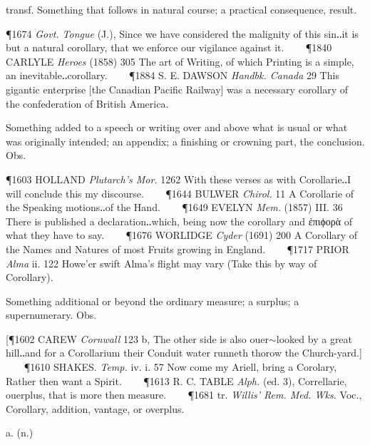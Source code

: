 \begin{description}[wide, labelwidth=!, labelindent=0pt]
\begin{myenumerate}
 transf. Something that follows in natural course; a practical consequence, result.

\P 1674  \textit{Govt. Tongue} (J.), Since we have considered the malignity of this sin‥it is but a natural corollary, that we enforce our vigilance against it.    
\P 1840 CARLYLE  \textit{Heroes} (1858) 305 The art of Writing, of which Printing is a simple, an inevitable‥corollary.    
\P 1884 S. E. DAWSON  \textit{Handbk. Canada} 29 This gigantic enterprise [the Canadian Pacific Railway] was a necessary corollary of the confederation of British America.

 Something added to a speech or writing over and above what is usual or what was originally intended; an appendix; a finishing or crowning part, the conclusion. Obs.

\P 1603 HOLLAND \textit{Plutarch's Mor.} 1262 With  these verses as with Corollarie‥I will conclude this my discourse.    
\P 1644 BULWER  \textit{Chirol.} 11 A Corollarie of the Speaking motions‥of the Hand.    
\P 1649 EVELYN  \textit{Mem.} (1857) III. 36 There is published a declaration‥which, being now the corollary and ἐπιϕορὰ of what they have to say.    
\P 1676 WORLIDGE  \textit{Cyder} (1691) 200 A Corollary of the Names and Natures of most Fruits growing in England.    
\P 1717 PRIOR  \textit{Alma} ii. 122 Howe'er swift Alma's flight may vary (Take this by way of Corollary).

 Something additional or beyond the ordinary measure; a surplus; a supernumerary. Obs.

[\P 1602 CAREW  \textit{Cornwall} 123 b, The other side is also ouer$\sim$looked by a great hill‥and for a Corollarium their Conduit water runneth thorow the Church-yard.]    
\P 1610 SHAKES.  \textit{Temp.} iv. i. 57 Now come my Ariell, bring a Corolary, Rather then want a Spirit.    
\P 1613 R. C. TABLE  \textit{Alph.} (ed. 3), Correllarie, ouerplus, that is more then measure.    
\P 1681 tr.  \textit{Willis' Rem. Med. Wks.} Voc., Corollary, addition, vantage, or overplus.
\end{myenumerate}


 a. (n.)

\noindent {}

\vspace{-0.3cm}


\end{description}
